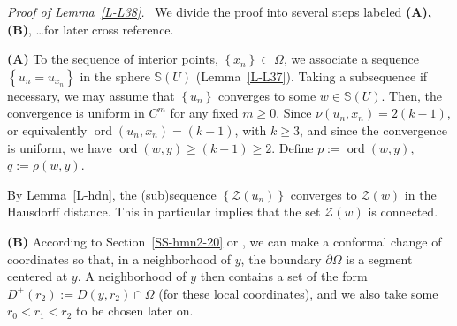 \documentclass[12pt,a4paper]{amsart}
\theoremstyle{plain} %
\theoremstyle{definition}
\numberwithin{equation}{section}
\numberwithin{figure}{section}
\numberwithin{table}{section}
\newcommand{\bS}{\mathbb{S}}
\newcommand{\cZ}{\mathcal{Z}}
\DeclareMathOperator{\ord}{ord}
\newcommand{\set}[1]{\left\lbrace #1 \right\rbrace}
\newcommand{\noi}{\noindent}
\begin{document}
\emph{Proof of Lemma~\ref{L-L38}.}~ We divide the proof into several steps labeled {\bf (A), (B)}, \ldots for later cross reference.\smallskip

\noi \textbf{(A)} To the sequence of interior points, $\set{x_n} \subset \Omega$, we associate a sequence $\set{u_n = u_{x_n}}$ in the sphere $\bS(U)$ (Lemma~\ref{L-L37}). Taking a subsequence if necessary, we may assume that $\set{u_n}$ converges to some $w \in \bS(U)$. Then, the convergence is uniform in $C^m$ for any fixed $m \ge 0$. Since $\nu(u_n,x_n) = 2(k-1)$, or equivalently $\ord(u_n,x_n) = (k-1)$, with $k \ge 3$, and since the convergence is uniform, we have $\ord(w,y) \ge (k-1) \ge 2$. Define $p := \ord(w,y)$, $q:=\rho(w,y)$.\smallskip

By Lemma~\ref{L-hdn}, the (sub)sequence $\set{\cZ(u_n)}$ converges to $\cZ(w)$ in the Hausdorff distance. This in particular implies that the set $\cZ(w)$ is connected.\medskip

\noi \textbf{(B)} According to Section~\ref{SS-hmn2-20} or \cite[Section~2]{YaZh2021}, we can make a conformal change of coordinates so that, in a neighborhood of $y$, the boundary $\partial \Omega$ is a segment centered at $y$. A neighborhood of $y$ then contains a set of the form $D^{+}(r_2) := D(y,r_2) \cap \Omega$ (for these local coordinates), and we also take some $r_0 < r_1 < r_2$ to be chosen later on.\medskip
\end{document}
